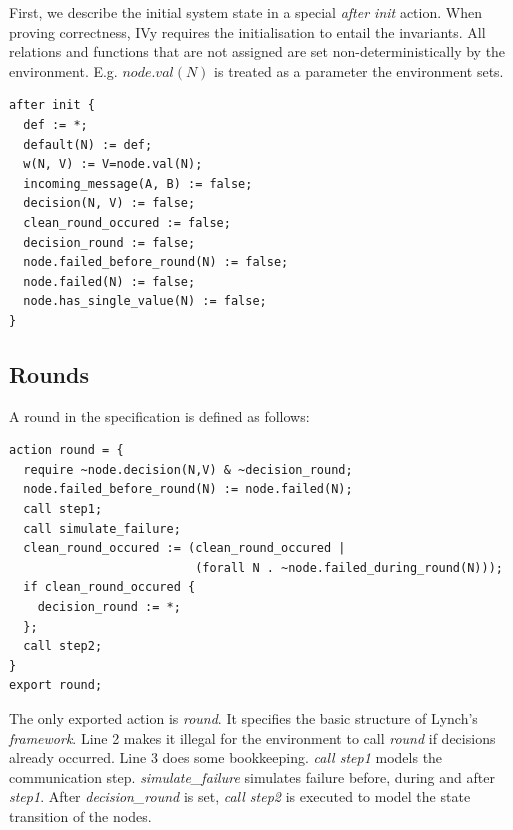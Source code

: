 \documentclass[fleqn]{article}
\begin{document}
First, we describe the initial system state in a special \textit{after init} action. When
proving correctness, IVy requires the initialisation to entail the invariants. All relations and functions
that are not assigned are set non-deterministically by the environment. E.g. $node.val(N)$ is
treated as a parameter the environment sets.

\begin{mdframed}[nobreak=true, backgroundcolor=light-gray, roundcorner=10pt,leftmargin=1, rightmargin=1, innerleftmargin=15, innertopmargin=15,innerbottommargin=15, outerlinewidth=1, linecolor=light-gray]
\begin{lstlisting}
after init {
  def := *;
  default(N) := def;
  w(N, V) := V=node.val(N);
  incoming_message(A, B) := false;
  decision(N, V) := false;
  clean_round_occured := false;
  decision_round := false;
  node.failed_before_round(N) := false;
  node.failed(N) := false;
  node.has_single_value(N) := false;
}
\end{lstlisting}
\end{mdframed}

\subsection{Rounds}

\noindent A round in the specification is defined as follows:
\begin{mdframed}[nobreak=true, backgroundcolor=light-gray, roundcorner=10pt,leftmargin=1, rightmargin=1, innerleftmargin=15, innertopmargin=15,innerbottommargin=15, outerlinewidth=1, linecolor=light-gray]
\begin{lstlisting}
action round = {
  require ~node.decision(N,V) & ~decision_round;
  node.failed_before_round(N) := node.failed(N);
  call step1;
  call simulate_failure;
  clean_round_occured := (clean_round_occured |
                          (forall N . ~node.failed_during_round(N)));
  if clean_round_occured {
    decision_round := *;
  };
  call step2;
}
export round;
\end{lstlisting}
\end{mdframed}

\noindent The only exported action is \textit{round}. It specifies the basic structure of Lynch's \textit{framework}.
\noindent Line 2 makes it illegal for the environment to call \textit{round} if decisions already occurred.
\noindent Line 3 does some bookkeeping.
\textit{call step1} models the communication step. \textit{simulate\_failure} simulates failure before, during
and after \textit{step1}. After \textit{decision\_round} is set, \textit{call step2} is executed to model the state transition of the nodes.
\end{document}
